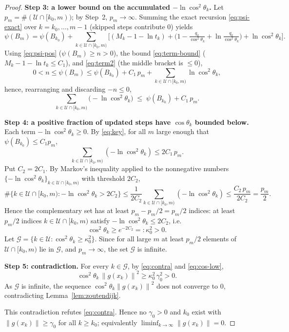\documentclass{amsart}
\theoremstyle{definition}
\newcommand{\norm}[1]{\left\lVert #1\right\rVert}
\begin{document}
\begin{proof}
\medskip\noindent\textbf{Step 3: a lower bound on the accumulated
$-\ln\cos^2\theta_k$.}
Let $p_m=\#(\mathcal{U}\cap[k_0,m))$; by Step~2, $p_m\to\infty$. Summing the
exact recursion \eqref{eq:psi-exact} over $k=k_0,\dots,m-1$ (skipped steps
contribute $0$) yields
\[
   \psi(B_m)=\psi(B_{k_0})
   +\!\!\sum_{k\in\mathcal{U}\cap[k_0,m)}\!\!
   \Big[(M_k-1-\ln t_k)
   +\big(1-\tfrac{q_k}{\cos^2\theta_k}+\ln\tfrac{q_k}{\cos^2\theta_k}\big)
   +\ln\cos^2\theta_k\Big].
\]
Using \eqref{eq:psi-pos} ($\psi(B_m)\ge n>0$), the bound \eqref{eq:term-bound}
($M_k-1-\ln t_k\le C_1$), and \eqref{eq:term2} (the middle bracket is $\le0$),
\[
   0<n\le\psi(B_m)\le\psi(B_{k_0})+C_1\,p_m
   +\!\!\sum_{k\in\mathcal{U}\cap[k_0,m)}\!\!\ln\cos^2\theta_k ,
\]
hence, rearranging and discarding $-n\le0$,
\begin{equation}\label{eq:key}
   \sum_{k\in\mathcal{U}\cap[k_0,m)}\big(-\ln\cos^2\theta_k\big)
   \;\le\;\psi(B_{k_0})+C_1\,p_m .
\end{equation}

\medskip\noindent\textbf{Step 4: a positive fraction of updated steps have
$\cos\theta_k$ bounded below.}
Each term $-\ln\cos^2\theta_k\ge0$. By \eqref{eq:key}, for all $m$ large enough
that $\psi(B_{k_0})\le C_1 p_m$,
\[
   \sum_{k\in\mathcal{U}\cap[k_0,m)}(-\ln\cos^2\theta_k)\le 2C_1\,p_m .
\]
Put $C_2=2C_1$. By Markov's inequality applied to the nonnegative numbers
$\{-\ln\cos^2\theta_k\}_{k\in\mathcal{U}\cap[k_0,m)}$ with threshold $2C_2$,
\[
   \#\{k\in\mathcal{U}\cap[k_0,m):-\ln\cos^2\theta_k>2C_2\}
   \le\frac{1}{2C_2}\sum_{k\in\mathcal{U}\cap[k_0,m)}(-\ln\cos^2\theta_k)
   \le\frac{C_2\,p_m}{2C_2}=\frac{p_m}{2}.
\]
Hence the complementary set has at least $p_m-p_m/2=p_m/2$ indices: at least
$p_m/2$ indices $k\in\mathcal{U}\cap[k_0,m)$ satisfy
$-\ln\cos^2\theta_k\le2C_2$, i.e.
\begin{equation}\label{eq:cos-low}
   \cos^2\theta_k\ge e^{-2C_2}=:\kappa_0^2>0 .
\end{equation}
Let $\mathcal{G}=\{k\in\mathcal{U}:\cos^2\theta_k\ge\kappa_0^2\}$. Since for all
large $m$ at least $p_m/2$ elements of $\mathcal{U}\cap[k_0,m)$ lie in
$\mathcal{G}$, and $p_m\to\infty$, the set $\mathcal{G}$ is infinite.

\medskip\noindent\textbf{Step 5: contradiction.} For every $k\in\mathcal{G}$, by
\eqref{eq:contra} and \eqref{eq:cos-low},
\[
   \cos^2\theta_k\,\norm{g(x_k)}^2\ge\kappa_0^2\,\gamma_0^2>0 .
\]
As $\mathcal{G}$ is infinite, the sequence $\cos^2\theta_k\norm{g(x_k)}^2$ does
not converge to $0$, contradicting Lemma~\ref{lem:zoutendijk}.

This contradiction refutes \eqref{eq:contra}. Hence no $\gamma_0>0$ and $k_0$
exist with $\norm{g(x_k)}\ge\gamma_0$ for all $k\ge k_0$; equivalently
$\liminf_{k\to\infty}\norm{g(x_k)}=0$.
\end{proof}
\end{document}

